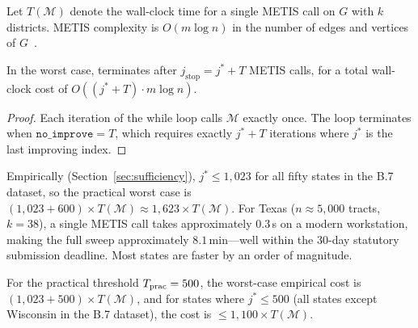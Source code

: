 Let $T(\mathcal{M})$ denote the wall-clock time for a single METIS call on
$G$ with $k$ districts.
METIS complexity is $O(m \log n)$ in the number of edges and vertices of
$G$~\citep{karypis1998}.

\begin{proposition}[Complexity]
\label{prop:complexity}
In the worst case, \cs{} terminates after $j_{\mathrm{stop}} = j^* + T$ METIS
calls, for a total wall-clock cost of $O((j^* + T) \cdot m \log n)$.
\end{proposition}

\begin{proof}
Each iteration of the while loop calls $\mathcal{M}$ exactly once.
The loop terminates when $\mathtt{no\_improve} = T$, which requires exactly
$j^* + T$ iterations where $j^*$ is the last improving index.
\end{proof}

Empirically (Section~\ref{sec:sufficiency}), $j^* \le 1{,}023$ for all fifty
states in the B.7 dataset, so the practical worst case is
$(1{,}023 + 600) \times T(\mathcal{M}) \approx 1{,}623 \times T(\mathcal{M})$.
For Texas ($n \approx 5{,}000$ tracts, $k = 38$), a single METIS call takes
approximately $0.3$\,s on a modern workstation, making the full sweep
approximately $8.1$\,min---well within the 30-day statutory submission deadline.
Most states are faster by an order of magnitude.

For the practical threshold $T_{\mathrm{prac}} = 500$, the worst-case empirical cost
is $(1{,}023 + 500) \times T(\mathcal{M})$, and for states where $j^* \le 500$
(all states except Wisconsin in the B.7 dataset), the cost is
$\le 1{,}100 \times T(\mathcal{M})$.
